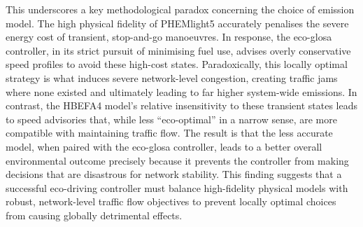 This underscores a key methodological paradox concerning the choice of emission model. The high physical fidelity of PHEMlight5 accurately penalises the severe energy cost of transient, stop-and-go manoeuvres. In response, the \ac{eco-glosa} controller, in its strict pursuit of minimising fuel use, advises overly conservative speed profiles to avoid these high-cost states. Paradoxically, this locally optimal strategy is what induces severe network-level congestion, creating traffic jams where none existed and ultimately leading to far higher system-wide emissions. In contrast, the HBEFA4 model's relative insensitivity to these transient states leads to speed advisories that, while less \enquote{eco-optimal} in a narrow sense, are more compatible with maintaining traffic flow. The result is that the less accurate model, when paired with the \ac{eco-glosa} controller, leads to a better overall environmental outcome precisely because it prevents the controller from making decisions that are disastrous for network stability. This finding suggests that a successful eco-driving controller must balance high-fidelity physical models with robust, network-level traffic flow objectives to prevent locally optimal choices from causing globally detrimental effects.

